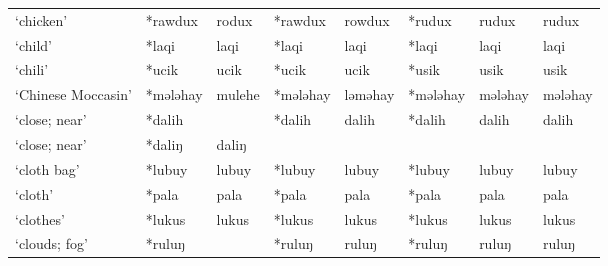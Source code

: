 \begin{landscape}
\begin{longtable}[c]{@{}p{3cm}<{\raggedright}p{2.75cm}<{\raggedright}p{2.75cm}<{\raggedright}p{2.75cm}<{\raggedright}p{2.75cm}<{\raggedright}p{2.75cm}<{\raggedright}p{2.75cm}<{\raggedright}p{2.75cm}<{\raggedright}@{}}
`chicken'                                            & *rawdux      & rodux                         & *rawdux        & rowdux                     & *rudux           & rudux                    & rudux                             \\
`child'                                              & *laqi        & laqi                          & *laqi          & laqi                       & *laqi            & laqi                     & laqi                              \\
`chili'                                              & *ucik        & ucik                          & *ucik          & ucik                       & *usik            & usik                     & usik                              \\
`Chinese Moccasin'                                   & *mələhay     & mulehe                        & *mələhay       & ləməhay                    & *mələhay         & mələhay                  & mələhay                           \\
`close; near'                                        & *dalih       &                               & *dalih         & dalih                      & *dalih           & dalih                    & dalih                             \\
`close; near'                                        & *daliŋ       & daliŋ                         &                &                            &                  &                          &                                   \\
`cloth bag'                                          & *lubuy       & lubuy                         & *lubuy         & lubuy                      & *lubuy           & lubuy                    & lubuy                             \\
`cloth'                                              & *pala        & pala                          & *pala          & pala                       & *pala            & pala                     & pala                              \\
`clothes'                                            & *lukus       & lukus                         & *lukus         & lukus                      & *lukus           & lukus                    & lukus                             \\
`clouds; fog'                                        & *ruluŋ       &                               & *ruluŋ         & ruluŋ                      & *ruluŋ           & ruluŋ                    & ruluŋ                             \\

\end{longtable}
\end{landscape}
